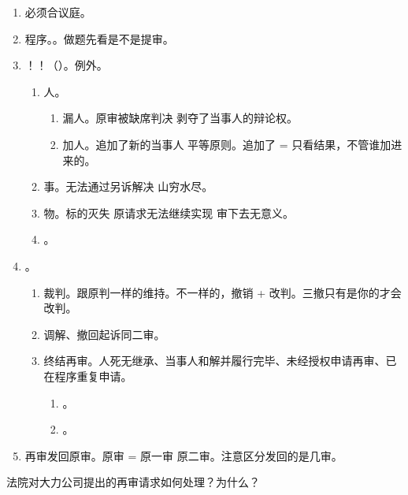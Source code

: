\begin{enumerate}
\begin{enumerate}
\begin{enumerate}
                \end{enumerate}
          \item 必须合议庭。
          \item 程序。。做题先看是不是提审。
          \item {}！！（）。例外。
                \begin{enumerate}
                  \item 人。
                        \begin{enumerate}
                          \item 漏人。原审被缺席判决 \yjt 剥夺了当事人的辩论权。
                          \item 加人。追加了新的当事人 \yjt 平等原则。追加了 = 只看结果，不管谁加进来的。
                        \end{enumerate}
                  \item 事。无法通过另诉解决 \yjt 山穷水尽。
                  \item 物。标的灭失 \yjt 原请求无法继续实现 \yjt 审下去无意义。
                  \item {}。
                \end{enumerate}
          \item {}。
                \begin{enumerate}
                  \item 裁判。跟原判一样的维持。不一样的，撤销 + 改判。三撤只有是你的才会改判。
                  \item 调解、撤回起诉同二审。
                  \item 终结再审。人死无继承、当事人和解并履行完毕、未经授权申请再审、已在程序重复申请。
                        \begin{enumerate}
                          \item {}。
                          \item {}。
                        \end{enumerate}
                \end{enumerate}
          \item 再审发回原审。原审 = 原一审 \hz 原二审。注意区分发回的是几审。
        \end{enumerate}
        \begin{kk}{法院对大力公司提出的再审请求如何处理？为什么？}

\end{kk}
\end{enumerate}
